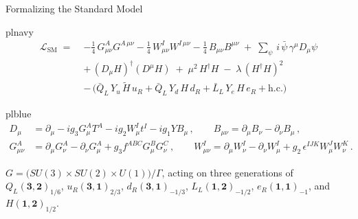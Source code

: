 \documentclass[aspectratio=169,10pt]{beamer}
\begin{document}
\begin{frame}{Formalizing the Standard Model}
  \vfill
  \begin{plplain}[top=3pt,bottom=3pt]{plnavy}
    \vspace{1pt}
    \begin{align*}
      \mathcal{L}_{\text{SM}} \;=\;
        & -\tfrac{1}{4}\,G^{A}_{\mu\nu}G^{A\,\mu\nu}
          -\tfrac{1}{4}\,W^{I}_{\mu\nu}W^{I\,\mu\nu}
          -\tfrac{1}{4}\,B_{\mu\nu}B^{\mu\nu}
          \;+\;\sum_{\psi}\, i\,\bar{\psi}\,\gamma^{\mu}D_{\mu}\psi\\
        & +\,(D_{\mu}H)^{\dagger}(D^{\mu}H)
          \;+\;\mu^{2}\,H^{\dagger}H\;-\;\lambda\,(H^{\dagger}H)^{2}\\
        & -\,\Big(\bar{Q}_{L}\,Y_{u}\,\tilde{H}\,u_{R}
                 +\bar{Q}_{L}\,Y_{d}\,H\,d_{R}
                 +\bar{L}_{L}\,Y_{e}\,H\,e_{R}
                 +\text{h.c.}\Big)
    \end{align*}
    \vspace{-9pt}
  \end{plplain}

  \begin{plplain}[top=3pt,bottom=3pt,before skip=2pt]{plblue}
    {\scriptsize
    \vspace{-3pt}
    \begin{align*}
      D_{\mu} &= \partial_{\mu} - i g_{3} G^{A}_{\mu}T^{A}
                 - i g_{2} W^{I}_{\mu}t^{I} - i g_{1} Y B_{\mu}\,,
      \qquad
      B_{\mu\nu} = \partial_{\mu}B_{\nu}-\partial_{\nu}B_{\mu}\,,\\
      G^{A}_{\mu\nu} &= \partial_{\mu}G^{A}_{\nu}-\partial_{\nu}G^{A}_{\mu}
                 + g_{3} f^{ABC} G^{B}_{\mu}G^{C}_{\nu}\,,
      \qquad
      W^{I}_{\mu\nu} = \partial_{\mu}W^{I}_{\nu}-\partial_{\nu}W^{I}_{\mu}
                 + g_{2}\,\epsilon^{IJK} W^{J}_{\mu}W^{K}_{\nu}\,.
    \end{align*}
    \vspace{-12pt}}
    \begin{center}\scriptsize
      $G=\big(SU(3)\times SU(2)\times U(1)\big)/\Gamma$, acting on three generations of\\
      $Q_{L}(\mathbf{3},\mathbf{2})_{1/6}$,
      $u_{R}(\mathbf{3},\mathbf{1})_{2/3}$,
      $d_{R}(\mathbf{3},\mathbf{1})_{-1/3}$,
      $L_{L}(\mathbf{1},\mathbf{2})_{-1/2}$,
      $e_{R}(\mathbf{1},\mathbf{1})_{-1}$, and $H(\mathbf{1},\mathbf{2})_{1/2}$.
    \end{center}
  \end{plplain}
  \vfill
\end{frame}
\end{document}
